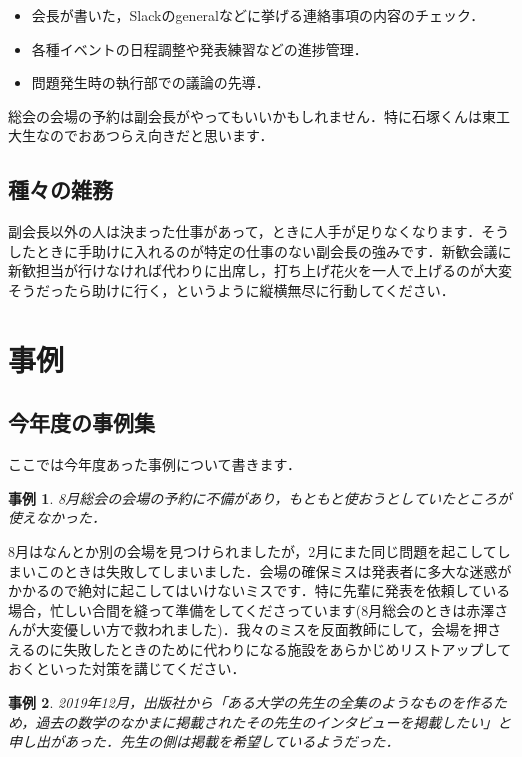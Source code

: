 \documentclass[uplatex]{jsarticle}
\newtheorem{case}{事例}
\begin{document}
\begin{itemize}
    \item 会長が書いた，Slackのgeneralなどに挙げる連絡事項の内容のチェック．
    \item 各種イベントの日程調整や発表練習などの進捗管理．
    \item 問題発生時の執行部での議論の先導．
\end{itemize}

総会の会場の予約は副会長がやってもいいかもしれません．特に石塚くんは東工大生なのでおあつらえ向きだと思います．

\subsection{種々の雑務}
副会長以外の人は決まった仕事があって，ときに人手が足りなくなります．そうしたときに手助けに入れるのが特定の仕事のない副会長の強みです．新歓会議に新歓担当が行けなければ代わりに出席し，打ち上げ花火を一人で上げるのが大変そうだったら助けに行く，というように縦横無尽に行動してください．

\section{事例}
\subsection{今年度の事例集} ここでは今年度あった事例について書きます．

\begin{case}
8月総会の会場の予約に不備があり，もともと使おうとしていたところが使えなかった．
\end{case}

8月はなんとか別の会場を見つけられましたが，2月にまた同じ問題を起こしてしまいこのときは失敗してしまいました．会場の確保ミスは発表者に多大な迷惑がかかるので絶対に起こしてはいけないミスです．特に先輩に発表を依頼している場合，忙しい合間を縫って準備をしてくださっています(8月総会のときは赤澤さんが大変優しい方で救われました)．我々のミスを反面教師にして，会場を押さえるのに失敗したときのために代わりになる施設をあらかじめリストアップしておくといった対策を講じてください．

\begin{case}
2019年12月，出版社から「ある大学の先生の全集のようなものを作るため，過去の数学のなかまに掲載されたその先生のインタビューを掲載したい」と申し出があった．先生の側は掲載を希望しているようだった．
\end{case}
\end{document}
